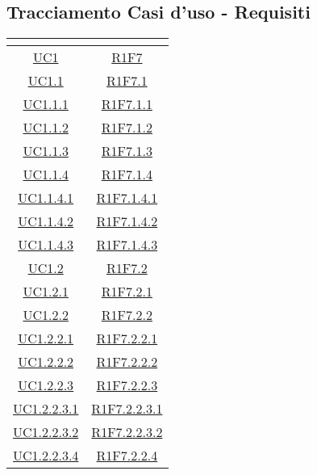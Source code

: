 \subsection{Tracciamento Casi d'uso - Requisiti}
\normalsize
\renewcommand{\arraystretch}{1.5}
\begin{longtable}{|c|c|}
	\hline
	\rowcolor{title_row}
	\textbf{\color{title_text}{Codice Casi d'uso}} & \textbf{\color{title_text}{Codice Requisiti}} \\
	\hline
	\endhead
	\hyperlink{UC1}{UC1} & \hyperlink{R1F7}{R1F7} \\
	\hline
	\hyperlink{UC1.1}{UC1.1} & \hyperlink{R1F7.1}{R1F7.1}\\
	\hline
	\hyperlink{UC1.1.1}{UC1.1.1} & \hyperlink{R1F7.1.1}{R1F7.1.1}\\
	\hline
	\hyperlink{UC1.1.2}{UC1.1.2} & \hyperlink{R1F7.1.2}{R1F7.1.2}\\
	\hline
	\hyperlink{UC1.1.3}{UC1.1.3} & \hyperlink{R1F7.1.3}{R1F7.1.3}\\
	\hline
	\hyperlink{UC1.1.4}{UC1.1.4} & \hyperlink{R1F7.1.4}{R1F7.1.4}\\
	\hline
	\hyperlink{UC1.1.4.1}{UC1.1.4.1} & \hyperlink{R1F7.1.4.1}{R1F7.1.4.1}\\
	\hline
	\hyperlink{UC1.1.4.2}{UC1.1.4.2} & \hyperlink{R1F7.1.4.2}{R1F7.1.4.2}\\
	\hline
	\hyperlink{UC1.1.4.3}{UC1.1.4.3} & \hyperlink{R1F7.1.4.3}{R1F7.1.4.3}\\
	\hline
	\hyperlink{UC1.2}{UC1.2} & \hyperlink{R1F7.2}{R1F7.2}\\
	\hline
	\hyperlink{UC1.2.1}{UC1.2.1} & \hyperlink{R1F7.2.1}{R1F7.2.1}\\
	\hline
	\hyperlink{UC1.2.2}{UC1.2.2} & \hyperlink{R1F7.2.2}{R1F7.2.2}\\
	\hline
	\hyperlink{UC1.2.2.1}{UC1.2.2.1} & \hyperlink{R1F7.2.2.1}{R1F7.2.2.1}\\
	\hline
	\hyperlink{UC1.2.2.2}{UC1.2.2.2} & \hyperlink{R1F7.2.2.2}{R1F7.2.2.2}\\
	\hline
	\hyperlink{UC1.2.2.3}{UC1.2.2.3} & \hyperlink{R1F7.2.2.3}{R1F7.2.2.3}\\
	\hline
	 \hyperlink{UC1.2.2.3.1}{UC1.2.2.3.1} &  \hyperlink{R1F7.2.2.3.1}{R1F7.2.2.3.1}\\
	\hline
	\hyperlink{UC1.2.2.3.2}{UC1.2.2.3.2} & \hyperlink{R1F7.2.2.3.2}{R1F7.2.2.3.2} \\
	\hline
	\hyperlink{UC1.2.2.4}{UC1.2.2.3.4} & \hyperlink{R1F7.2.2.4}{R1F7.2.2.4} \\
	\hline

\end{longtable}
